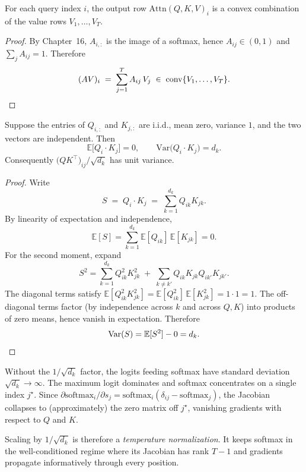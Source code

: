 \begin{theorem}
For each query index $i$, the output row $\mathrm{Attn}(Q,K,V)_i$ is a convex combination of the value rows $V_1, \dots, V_T$.
\end{theorem}
\begin{proof}
By Chapter~16, $A_{i,:}$ is the image of a softmax, hence $A_{ij} \in (0,1)$ and $\sum_j A_{ij} = 1$. Therefore
\[
(AV)_i \;=\; \sum_{j=1}^{T} A_{ij}\, V_j \;\in\; \mathrm{conv}\{V_1, \dots, V_T\}. \qedhere
\]
\end{proof}

\begin{theorem}
\label{thm:variance}
Suppose the entries of $Q_{i,:}$ and $K_{j,:}$ are i.i.d., mean zero, variance $1$, and the two vectors are independent. Then
\[
\mathbb{E}\bigl[Q_i \cdot K_j\bigr] = 0, \qquad \mathrm{Var}\bigl(Q_i \cdot K_j\bigr) = d_k.
\]
Consequently $\bigl(QK^\top\bigr)_{ij}/\sqrt{d_k}$ has unit variance.
\end{theorem}
\begin{proof}
Write
\[
S \;=\; Q_i \cdot K_j \;=\; \sum_{k=1}^{d_k} Q_{ik} K_{jk}.
\]
By linearity of expectation and independence,
\[
\mathbb{E}[S] = \sum_{k=1}^{d_k} \mathbb{E}[Q_{ik}]\,\mathbb{E}[K_{jk}] = 0.
\]
For the second moment, expand
\[
S^2 = \sum_{k=1}^{d_k} Q_{ik}^2 K_{jk}^2 \;+\; \sum_{k \neq k'} Q_{ik} K_{jk} Q_{ik'} K_{jk'}.
\]
The diagonal terms satisfy $\mathbb{E}[Q_{ik}^2 K_{jk}^2] = \mathbb{E}[Q_{ik}^2]\,\mathbb{E}[K_{jk}^2] = 1\cdot 1 = 1$. The off-diagonal terms factor (by independence across $k$ and across $Q,K$) into products of zero means, hence vanish in expectation. Therefore
\[
\mathrm{Var}(S) = \mathbb{E}[S^2] - 0 = d_k. \qedhere
\]
\end{proof}

\begin{corollary}
Without the $1/\sqrt{d_k}$ factor, the logits feeding softmax have standard deviation $\sqrt{d_k} \to \infty$. The maximum logit dominates and softmax concentrates on a single index $j^\star$. Since $\partial \mathrm{softmax}_i/\partial s_j = \mathrm{softmax}_i(\delta_{ij} - \mathrm{softmax}_j)$, the Jacobian collapses to (approximately) the zero matrix off $j^\star$, vanishing gradients with respect to $Q$ and $K$.
\end{corollary}

\begin{remark}
Scaling by $1/\sqrt{d_k}$ is therefore a \emph{temperature normalization}. It keeps softmax in the well-conditioned regime where its Jacobian has rank $T-1$ and gradients propagate informatively through every position.
\end{remark}

